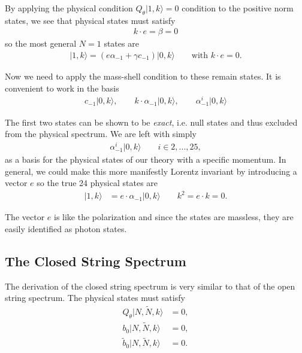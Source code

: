\documentclass[notitlepage,amsmath,amssymb,aps, pra, 10pt]{revtex4-1}
\begin{document}
        By applying the physical condition $Q_{\theta}| 1, k\rangle = 0$ condition to the positive norm states, we see that physical states must satisfy
        \begin{align}
            k\cdot e = \beta = 0
        \end{align}
        so the most general $N=1$ states are
        \begin{align}
            |1, k\rangle = (e\alpha_{-1} + \gamma c_{-1}) |0, k\rangle \qquad \text{with } k\cdot e = 0.
        \end{align}

        Now we need to apply the mass-shell condition to these remain states. It is convenient to work in the basis
        \begin{align}
            c_{-1}  |0, k\rangle, \qquad k\cdot \alpha_{-1}|0, k\rangle, \qquad  \alpha_{-1}^i|0, k\rangle
        \end{align}

        The first two states can be shown to be \emph{exact}, i.e. null states and thus excluded from the physical spectrum. We are left with simply
        \begin{align}
           \alpha_{-1}^i|0, k\rangle \qquad i\in{2, ..., 25},
        \end{align}
        as a basis for the physical states of our theory with a specific momentum. In general, we could make this more manifestly Lorentz invariant by  introducing a vector $e$ so the true 24 physical states are
        \begin{align}
        |1, k\rangle &= e \cdot \alpha_{-1}|0, k\rangle \qquad k^2 = e\cdot k = 0.
        \end{align}

        The vector $e$ is like the polarization and since the states are massless, they are easily identified as photon states.

    \subsection{The Closed String Spectrum}

        The derivation of the closed string spectrum is very similar to that of the open string spectrum. The physical states must satisfy
        \begin{align}
          Q_{\theta} |N, \tilde N, k\rangle &=0, \\ b_0 |N, \tilde N, k\rangle &=0, \\
          \tilde b_0 |N, \tilde N, k\rangle &=0.
        \end{align}
\end{document}
